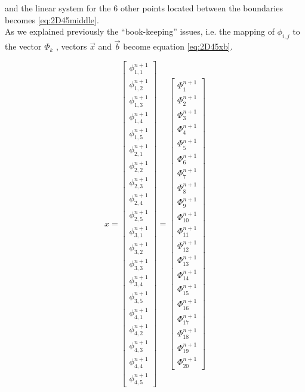 and the linear system for the $6$ other points located between the boundaries becomes \ref{eq:2D45middle}.  
\\


As we explained previously the “book-keeping” issues, i.e. the mapping of $\phi_{i,j}$ to the vector $\Phi_k$ , vectors $\vec{x}$ and $\vec{b}$ become equation \ref{eq:2D45xb}.

\begin{equation}
x= \begin{bmatrix}
	\phi^{n+1}_{1,1} \\ \phi^{n+1}_{1,2} \\ \phi^{n+1}_{1,3} \\ \phi^{n+1}_{1,4} \\ \phi^{n+1}_{1,5} \\ \phi^{n+1}_{2,1} \\ \phi^{n+1}_{2,2} \\ \phi^{n+1}_{2,3} \\ \phi^{n+1}_{2,4} \\ \phi^{n+1}_{2,5} \\ \phi^{n+1}_{3,1} \\ \phi^{n+1}_{3,2} \\ \phi^{n+1}_{3,3} \\ \phi^{n+1}_{3,4} \\ \phi^{n+1}_{3,5} \\ \phi^{n+1}_{4,1} \\ \phi^{n+1}_{4,2} \\ \phi^{n+1}_{4,3} \\ \phi^{n+1}_{4,4} \\ \phi^{n+1}_{4,5} 
\end{bmatrix}
=
   \begin{bmatrix}
	\Phi^{n+1}_{1} \\ \Phi^{n+1}_{2} \\ \Phi^{n+1}_{3} \\ \Phi^{n+1}_{4} \\ \Phi^{n+1}_{5} \\ \Phi^{n+1}_{6} \\ \Phi^{n+1}_{7} \\ \Phi^{n+1}_{8} \\ \Phi^{n+1}_{9} \\ \Phi^{n+1}_{10} \\ \Phi^{n+1}_{11} \\ \Phi^{n+1}_{12} \\ \Phi^{n+1}_{13} \\ \Phi^{n+1}_{14} \\ \Phi^{n+1}_{15} \\ \Phi^{n+1}_{16} \\ \Phi^{n+1}_{17} \\ \Phi^{n+1}_{18} \\ \Phi^{n+1}_{19} \\ \Phi^{n+1}_{20} 

\end{bmatrix}
\end{equation}
